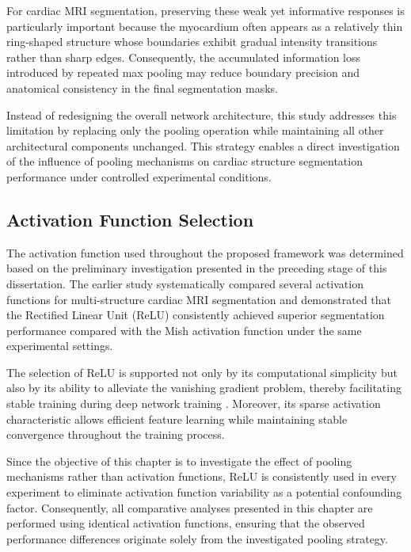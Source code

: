 For cardiac MRI segmentation, preserving these weak yet informative responses is particularly important because the myocardium often appears as a relatively thin ring-shaped structure whose boundaries exhibit gradual intensity transitions rather than sharp edges. Consequently, the accumulated information loss introduced by repeated max pooling may reduce boundary precision and anatomical consistency in the final segmentation masks.

Instead of redesigning the overall network architecture, this study addresses this limitation by replacing only the pooling operation while maintaining all other architectural components unchanged. This strategy enables a direct investigation of the influence of pooling mechanisms on cardiac structure segmentation performance under controlled experimental conditions.

\subsection{Activation Function Selection}
\label{subsec:ch4-activation}

The activation function used throughout the proposed framework was determined based on the preliminary investigation presented in the preceding stage of this dissertation. The earlier study systematically compared several activation functions for multi-structure cardiac MRI segmentation and demonstrated that the Rectified Linear Unit (ReLU) consistently achieved superior segmentation performance compared with the Mish activation function under the same experimental settings.

The selection of ReLU is supported not only by its computational simplicity but also by its ability to alleviate the vanishing gradient problem, thereby facilitating stable training during deep network training \citep{Nair2010}. Moreover, its sparse activation characteristic allows efficient feature learning while maintaining stable convergence throughout the training process.

Since the objective of this chapter is to investigate the effect of pooling mechanisms rather than activation functions, ReLU is consistently used in every experiment to eliminate activation function variability as a potential confounding factor. Consequently, all comparative analyses presented in this chapter are performed using identical activation functions, ensuring that the observed performance differences originate solely from the investigated pooling strategy.

